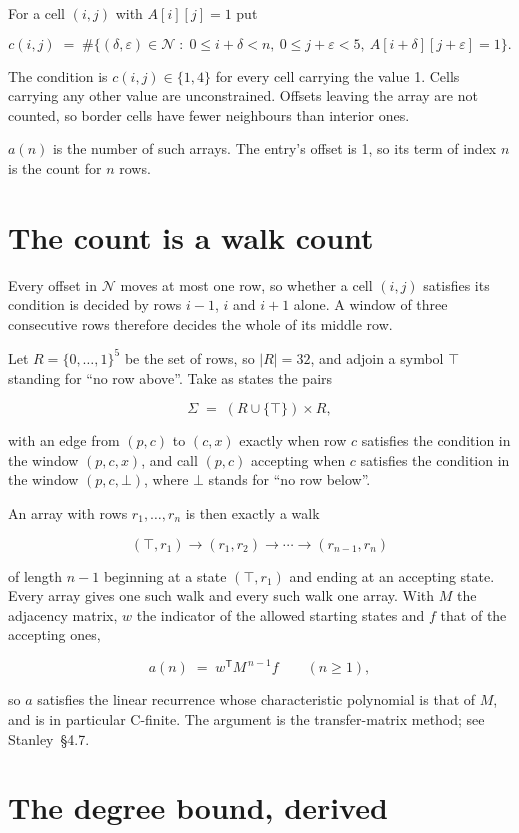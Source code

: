 \documentclass[11pt]{article}
\theoremstyle{definition}
\begin{document}
For a cell $(i,j)$ with $A[i][j] = 1$ put

\[c(i,j) \;=\; \#\bigl\{(\delta,\varepsilon)\in\mathcal{N} \;:\; 0\le i+\delta<n,\ 0\le j+\varepsilon<5,\ A[i+\delta][j+\varepsilon] = 1\bigr\}.\]

The condition is $c(i,j) \in \{1, 4\}$ for every cell carrying the value 1. Cells carrying any other value are unconstrained. Offsets leaving the array are not counted, so border cells have fewer neighbours than interior ones.

$a(n)$ is the number of such arrays. The entry's offset is 1, so its term of index $n$ is the count for $n$ rows.

\section{The count is a walk count}

Every offset in $\mathcal{N}$ moves at most one row, so whether a cell $(i,j)$ satisfies its condition is decided by rows $i-1$, $i$ and $i+1$ alone. A window of three consecutive rows therefore decides the whole of its middle row.

Let $R = \{0,\dots,1\}^{5}$ be the set of rows, so $|R| = 32$, and adjoin a symbol $\top$ standing for ``no row above''. Take as states the pairs

\[\Sigma \;=\; (R \cup \{\top\}) \times R,\]

with an edge from $(p,c)$ to $(c,x)$ exactly when row $c$ satisfies the condition in the window $(p,c,x)$, and call $(p,c)$ accepting when $c$ satisfies the condition in the window $(p,c,\bot)$, where $\bot$ stands for ``no row below''.

An array with rows $r_1,\dots,r_n$ is then exactly a walk

\[(\top,r_1) \to (r_1,r_2) \to \cdots \to (r_{n-1},r_n)\]

of length $n-1$ beginning at a state $(\top,r_1)$ and ending at an accepting state. Every array gives one such walk and every such walk one array. With $M$ the adjacency matrix, $w$ the indicator of the allowed starting states and $f$ that of the accepting ones,

\[a(n) \;=\; w^{\mathsf T} M^{\,n-1} f \qquad (n \ge 1),\]

so $a$ satisfies the linear recurrence whose characteristic polynomial is that of $M$, and is in particular C-finite. The argument is the transfer-matrix method; see Stanley~\S4.7.

\section{The degree bound, derived}
\end{document}
